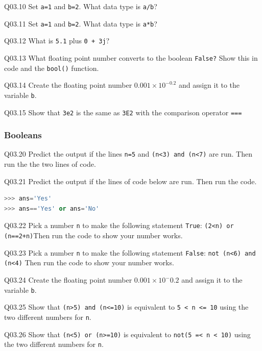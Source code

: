 \documentclass{book}
\begin{document}
Q03.10 Set \lstinline!a=1! and \lstinline!b=2!. What data type is
\lstinline!a/b!?

Q03.11 Set \lstinline!a=1! and \lstinline!b=2!. What data type is
\lstinline!a*b!?

Q03.12 What is \lstinline!5.1! plus \lstinline!0 + 3j!?

Q03.13 What floating point number converts to the boolean
\lstinline!False?! Show this in code and the \lstinline!bool()!
function.

Q03.14 Create the floating point number \(0.001 \times 10^{-0.2}\) and
assign it to the variable \lstinline!b!.

Q03.15 Show that \lstinline!3e2! is the same as \lstinline!3E2! with the
comparison operator \lstinline!===!
    




    
        \subsubsection{Booleans}\label{booleans}

Q03.20 Predict the output if the lines \lstinline!n=5! and
\lstinline!(n<3) and (n<7)! are run. Then run the the two lines of code.

Q03.21 Predict the output if the lines of code below are run. Then run
the code.

\begin{lstlisting}[language=Python]
>>> ans='Yes'
>>> ans=='Yes' or ans='No'
\end{lstlisting}

Q03.22 Pick a number \lstinline!n! to make the following statement
\lstinline!True!: \lstinline!(2<n) or (n==2+n)!Then run the code to show
your number works.

Q03.23 Pick a number \lstinline!n! to make the following statement
\lstinline!False!: \lstinline!not (n<6) and (n<4)! Then run the code to
show your number works.

Q03.24 Create the floating point number \(0.001 \times 10^-0.2\) and
assign it to the variable \lstinline!b!.

Q03.25 Show that \lstinline!(n>5) and (n<=10)! is equivalent to
\lstinline!5 < n <= 10! using the two different numbers for
\lstinline!n!.

Q03.26 Show that \lstinline!(n<5) or (n>=10)! is equivalent to
\lstinline!not(5 =< n < 10)! using the two different numbers for
\lstinline!n!.
    
\end{document}
